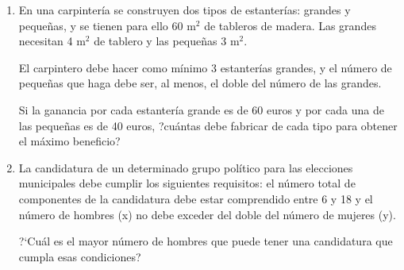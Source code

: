 \begin{adjustwidth}{20pt}{10pt}
\begin{enumerate}[PB. 1. ]
\hspace{-15mm}\vspace{1cm}




\item En una carpintería se construyen dos tipos de estanterías: grandes y pequeñas, y se tienen para ello 60 m$^2$ de tableros de madera. Las grandes necesitan 4 m$^2$ de tablero y las pequeñas 3 m$^2$.

El carpintero debe hacer como mínimo 3 estanterías grandes, y el número de pequeñas que haga debe ser, al menos, el doble del número de las grandes.

Si la ganancia por cada estantería grande es de 60 euros y por cada una de las pequeñas es de 40 euros, ?cuántas debe fabricar de cada tipo para obtener el máximo beneficio?

\hspace{-15mm}\vspace{1cm}



\item La candidatura de un determinado grupo político para las elecciones
municipales debe cumplir los siguientes requisitos: el número total de componentes de la candidatura debe estar comprendido entre 6 y 18 y el número de hombres (x) no debe exceder del doble del número de mujeres (y).

?`Cuál es el mayor número de hombres que puede tener una candidatura que cumpla esas condiciones?

\hspace{-15mm}\vspace{1cm}

\end{enumerate}
\end{adjustwidth}
